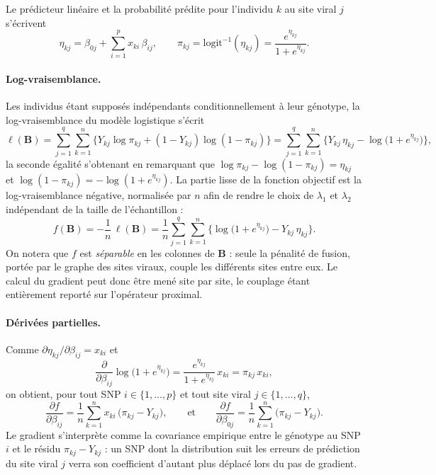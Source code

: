 \documentclass[11pt,a4paper]{article}
\begin{document}
Le prédicteur linéaire et la probabilité prédite pour l'individu $k$ au site
viral $j$ s'écrivent
\[
\eta_{kj} = \beta_{0j} + \sum_{i=1}^{p} x_{ki}\,\beta_{ij},
\qquad
\pi_{kj} = \text{logit}^{-1}(\eta_{kj}) = \frac{e^{\eta_{kj}}}{1 + e^{\eta_{kj}}} .
\]

\paragraph{Log-vraisemblance.}
Les individus étant supposés indépendants conditionnellement à leur génotype,
la log-vraisemblance du modèle logistique s'écrit
\[
\ell(\mathbf{B}) = \sum_{j=1}^{q} \sum_{k=1}^{n}
\Big\{ Y_{kj} \log \pi_{kj} + (1 - Y_{kj})\log(1 - \pi_{kj}) \Big\}
= \sum_{j=1}^{q} \sum_{k=1}^{n}
\Big\{ Y_{kj}\, \eta_{kj} - \log\!\big(1 + e^{\eta_{kj}}\big) \Big\},
\]
la seconde égalité s'obtenant en remarquant que
$\log \pi_{kj} - \log(1-\pi_{kj}) = \eta_{kj}$ et
$\log(1-\pi_{kj}) = -\log(1+e^{\eta_{kj}})$. La partie lisse de la fonction
objectif est la log-vraisemblance négative, normalisée par $n$ afin de rendre
le choix de $\lambda_1$ et $\lambda_2$ indépendant de la taille de
l'échantillon :
\[
f(\mathbf{B}) = -\frac{1}{n}\,\ell(\mathbf{B})
= \frac{1}{n} \sum_{j=1}^{q}\sum_{k=1}^{n}
\Big\{ \log\!\big(1 + e^{\eta_{kj}}\big) - Y_{kj}\, \eta_{kj} \Big\}.
\]
On notera que $f$ est \emph{séparable} en les colonnes de $\mathbf{B}$ : seule
la pénalité de fusion, portée par le graphe des sites viraux, couple les
différents sites entre eux. Le calcul du gradient peut donc être mené site par
site, le couplage étant entièrement reporté sur l'opérateur proximal.

\paragraph{Dérivées partielles.}
Comme $\partial \eta_{kj} / \partial \beta_{ij} = x_{ki}$ et
\[
\frac{\partial}{\partial \beta_{ij}} \log\!\big(1 + e^{\eta_{kj}}\big)
= \frac{e^{\eta_{kj}}}{1 + e^{\eta_{kj}}} \, x_{ki} = \pi_{kj} \, x_{ki},
\]
on obtient, pour tout SNP $i \in \{1,\dots,p\}$ et tout site viral
$j \in \{1,\dots,q\}$,
\[
\frac{\partial f}{\partial \beta_{ij}}
= \frac{1}{n} \sum_{k=1}^{n} x_{ki}\,\big(\pi_{kj} - Y_{kj}\big),
\qquad\text{et}\qquad
\frac{\partial f}{\partial \beta_{0j}}
= \frac{1}{n} \sum_{k=1}^{n} \big(\pi_{kj} - Y_{kj}\big).
\]
Le gradient s'interprète comme la covariance empirique entre le génotype au
SNP $i$ et le résidu $\pi_{kj} - Y_{kj}$ : un SNP dont la distribution suit
les erreurs de prédiction du site viral $j$ verra son coefficient d'autant
plus déplacé lors du pas de gradient.
\end{document}
